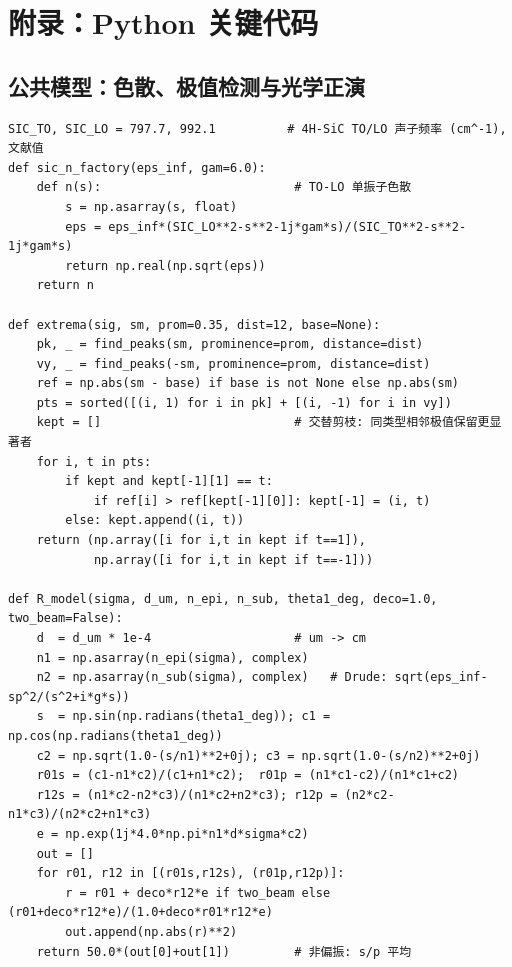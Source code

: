 \documentclass[11pt,a4paper,fontset=fandol]{ctexart}
\begin{document}
\newpage
\appendix
\section{附录：Python 关键代码}

\subsection{公共模型：色散、极值检测与光学正演}
\begin{lstlisting}
SIC_TO, SIC_LO = 797.7, 992.1          # 4H-SiC TO/LO 声子频率 (cm^-1), 文献值
def sic_n_factory(eps_inf, gam=6.0):
    def n(s):                           # TO-LO 单振子色散
        s = np.asarray(s, float)
        eps = eps_inf*(SIC_LO**2-s**2-1j*gam*s)/(SIC_TO**2-s**2-1j*gam*s)
        return np.real(np.sqrt(eps))
    return n

def extrema(sig, sm, prom=0.35, dist=12, base=None):
    pk, _ = find_peaks(sm, prominence=prom, distance=dist)
    vy, _ = find_peaks(-sm, prominence=prom, distance=dist)
    ref = np.abs(sm - base) if base is not None else np.abs(sm)
    pts = sorted([(i, 1) for i in pk] + [(i, -1) for i in vy])
    kept = []                           # 交替剪枝: 同类型相邻极值保留更显著者
    for i, t in pts:
        if kept and kept[-1][1] == t:
            if ref[i] > ref[kept[-1][0]]: kept[-1] = (i, t)
        else: kept.append((i, t))
    return (np.array([i for i,t in kept if t==1]),
            np.array([i for i,t in kept if t==-1]))

def R_model(sigma, d_um, n_epi, n_sub, theta1_deg, deco=1.0, two_beam=False):
    d  = d_um * 1e-4                    # um -> cm
    n1 = np.asarray(n_epi(sigma), complex)
    n2 = np.asarray(n_sub(sigma), complex)   # Drude: sqrt(eps_inf-sp^2/(s^2+i*g*s))
    s  = np.sin(np.radians(theta1_deg)); c1 = np.cos(np.radians(theta1_deg))
    c2 = np.sqrt(1.0-(s/n1)**2+0j); c3 = np.sqrt(1.0-(s/n2)**2+0j)
    r01s = (c1-n1*c2)/(c1+n1*c2);  r01p = (n1*c1-c2)/(n1*c1+c2)
    r12s = (n1*c2-n2*c3)/(n1*c2+n2*c3); r12p = (n2*c2-n1*c3)/(n2*c2+n1*c3)
    e = np.exp(1j*4.0*np.pi*n1*d*sigma*c2)
    out = []
    for r01, r12 in [(r01s,r12s), (r01p,r12p)]:
        r = r01 + deco*r12*e if two_beam else (r01+deco*r12*e)/(1.0+deco*r01*r12*e)
        out.append(np.abs(r)**2)
    return 50.0*(out[0]+out[1])         # 非偏振: s/p 平均
\end{lstlisting}
\end{document}
